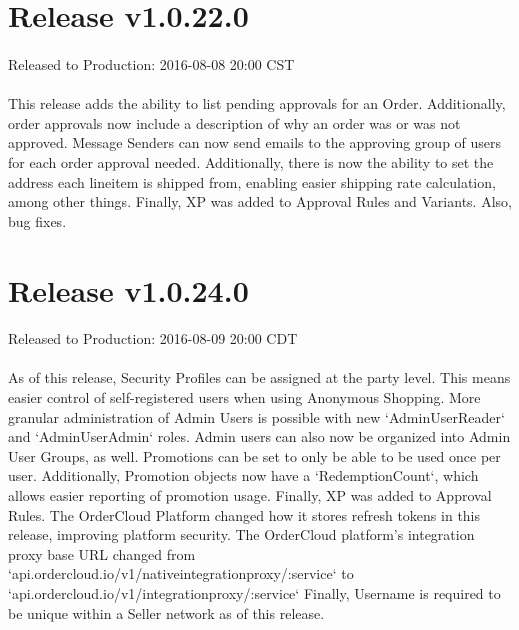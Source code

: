 \documentclass{memoir}%
\begin{document}
%
\section*{Release v1.0.22.0}%
\paragraph*{}%
Released to Production: 2016{-}08{-}08 20:00 CST

%
\paragraph*{}%
This release adds the ability to list pending approvals for an Order. Additionally, order approvals now include a description of why an order was or was not approved. Message Senders can now send emails to the approving group of users for each order approval needed. Additionally, there is now the ability to set the address each lineitem is shipped from, enabling easier shipping rate calculation, among other things. Finally, XP was added to Approval Rules and Variants. Also, bug fixes.

%
\section*{Release v1.0.24.0}%
\paragraph*{}%
Released to Production: 2016{-}08{-}09 20:00 CDT

%
\paragraph*{}%
As of this release, Security Profiles can be assigned at the party level. This means easier control of self{-}registered users when using Anonymous Shopping. More granular administration of Admin Users is possible with new `AdminUserReader` and `AdminUserAdmin` roles. Admin users can also now be organized into Admin User Groups, as well. Promotions can be set to only be able to be used once per user. Additionally, Promotion objects now have a `RedemptionCount`, which allows easier reporting of promotion usage. Finally, XP was added to Approval Rules. \newline%
 The OrderCloud Platform changed how it stores refresh tokens in this release, improving platform security.\newline%
 The OrderCloud platform's integration proxy base URL changed from `api.ordercloud.io/v1/nativeintegrationproxy/:service` to `api.ordercloud.io/v1/integrationproxy/:service`\newline%
 Finally, Username is required to be unique within a Seller network as of this release. 
\end{document}
